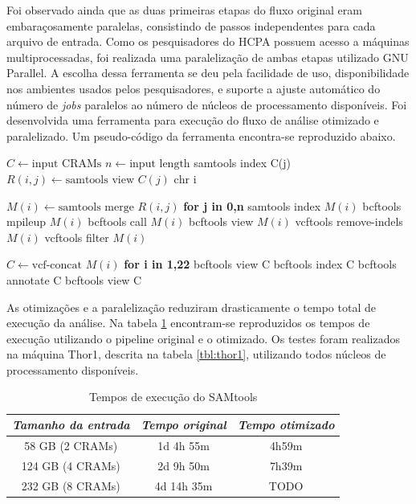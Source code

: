 \documentclass[cic,tc]{iiufrgs}
\begin{document}
Foi observado ainda que as duas primeiras etapas do fluxo original eram
embaraçosamente paralelas, consistindo de passos independentes para cada
arquivo de entrada.  Como os pesquisadores do HCPA possuem acesso a máquinas
multiprocessadas, foi realizada uma paralelização de ambas etapas utilizado GNU
Parallel\cite{tange_ole_2021_5233953}. A escolha dessa ferramenta se deu pela
facilidade de uso, disponibilidade nos ambientes usados pelos pesquisadores, e
suporte a ajuste automático do número de \textit{jobs} paralelos ao número de
núcleos de processamento disponíveis. Foi desenvolvida uma ferramenta para
execução do fluxo de análise otimizado e paralelizado. Um pseudo-código da
ferramenta encontra-se reproduzido abaixo.

\begin{algorithmic}
  \State $C \gets \text{input CRAMs}$
  \State $n \gets \text{input length}$
  \State samtools index C(j)
    \State $R(i,j) \gets \text{samtools view } C(j) \text{ chr i}$
  \EndFor
\EndFor

  \State $M(i) \gets \text{samtools merge } R(i,j)$ \textbf{for j in 0,n}
  \State samtools index $M(i)$
  \State bcftools mpileup $M(i)$
  \State bcftools call $M(i)$
  \State bcftools view $M(i)$
  \State vcftools remove-indels $M(i)$
  \State vcftools filter $M(i)$
\EndFor

\State $C \gets \text{vcf-concat } M(i)$ \textbf{for i in 1,22}
\State bcftools view C
\State bcftools index C
\State bcftools annotate C
\State bcftools view C
\end{algorithmic}

As otimizações e a paralelização reduziram drasticamente o tempo total de
execução da análise. Na tabela \ref{tbl:SAMtools} encontram-se reproduzidos os
tempos de execução utilizando o pipeline original e o otimizado. Os testes
foram realizados na máquina Thor1, descrita na tabela \ref{tbl:thor1},
utilizando todos núcleos de processamento disponíveis.

\begin{table}[h]
    \caption{Tempos de execução do SAMtools}
    \centering
        \begin{tabular}{c|c|c}
          \hline
          \textit{Tamanho da entrada}  &   \textit{Tempo original}  & \textit{Tempo otimizado} \\
          \hline
          \hline
          58 GB (2 CRAMs) & 1d 4h 55m & 4h59m \\
          124 GB (4 CRAMs) & 2d 9h 50m & 7h39m \\
          232 GB (8 CRAMs) & 4d 14h 35m & TODO \\
          \hline
        \end{tabular}
    \label{tbl:SAMtools}
\end{table}
\end{document}
